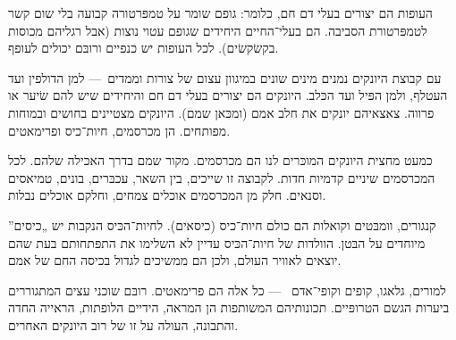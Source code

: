 
העופות הם יצורים בעלי דם חם, כלומר: גופם שומר על טמפּרטורה קבועה בלי שום קשר לטמפּרטורת הסביבה. הם בעלי־החיים היחידים שגופם עטוי נוצות (אבל רגליהם מכוסות בקשׂקשׂים). לכל העופות יש כנפיים ורובּם יכולים לעופף.



עם קבוצת היונקים נמנים מינים שונים במיגוון עצום של צורות וממדים~— למן הדולפין ועד העטלף, ולמן הפּיל ועד הכּלב. היונקים הם יצורים בעלי דם חם והיחידים שיש להם שׂיער או פרווה. צאצאיהם יונקים את חלב אמם (ומכּאן שמם). היונקים מצטיינים בחושים ובמוחות מפותחים.  הן מכרסמים, חיות־כיס ופרימאטים.



כמעט מחצית היונקים המוכּרים לנו הם מכרסמים. מקור שמם בדרך האכילה שלהם. לכל המכרסמים שיניים קדמיות חדות. לקבוצה זו שייכים, בין השאר, עכבּרים, בונים, טמיאסים וסנאים. חלק מן המכרסמים אוכלים צמחים, וחלקם אוכלים נבלות.



קנגורים, וומבּטים וקואלות הם כולם חיות־כיס (כיסאים). לחיות־הכּיס הנקבות יש „כיסים” מיוחדים על הבּטן. הוולדות של חיות־הכּיס עדיין לא השלימו את התפּתחותם בעת שהם יוצאים לאוויר העולם, ולכן הם ממשיכים לגדול בכיסה החם של אמם.



למורים, גלאגו, קופים וקופי־אדם ~— כל אלה הם פרימאטים. רובּם שוכני עצים המתגוררים ביערות הגשם הטרופּיים. תכונותיהם המשותפות הן המראה, הידיים הלופתות, הראייה החדה והתבונה, העולה על זו של רוב היונקים האחרים.
